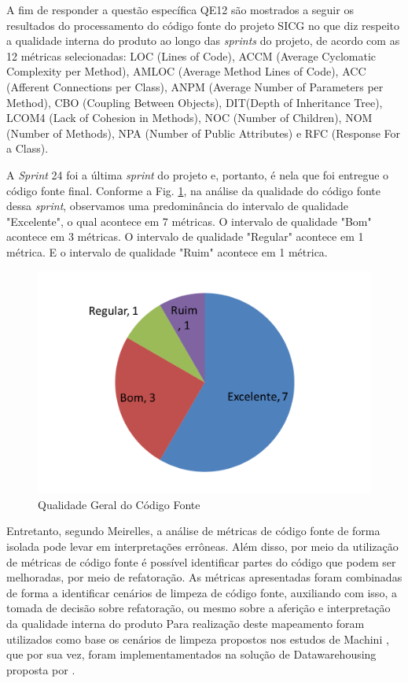 A fim de responder a questão específica QE12 são mostrados a seguir os resultados do processamento do código fonte do projeto SICG no que diz respeito a qualidade interna do produto ao longo das \textit{sprints} do projeto, 
de acordo com as 12 métricas selecionadas: LOC (Lines of Code), ACCM (Average Cyclomatic Complexity per Method), AMLOC (Average Method Lines of Code), ACC (Afferent Connections per Class), ANPM (Average Number of Parameters per Method),
CBO (Coupling Between Objects), DIT(Depth of Inheritance Tree), LCOM4 (Lack of Cohesion in Methods), NOC (Number of Children), NOM (Number of Methods), NPA (Number of Public Attributes) e RFC (Response For a Class).


A \textit{Sprint} 24 foi a última \textit{sprint} do projeto e, portanto, é nela que foi entregue o código fonte final. Conforme a Fig. \ref{pizzatotal}, na análise da qualidade do código fonte dessa \textit{sprint}, observamos uma predominância do intervalo de qualidade "Excelente", o qual acontece em 7 métricas. O intervalo de qualidade "Bom" acontece em 3 métricas. O intervalo de qualidade "Regular" acontece em 1 métrica. E o intervalo de qualidade "Ruim" acontece em 1 métrica.

\begin{figure}[h]
		\centering
			\includegraphics[scale=0.4]{figuras/pizzatotal.png}
		\caption{Qualidade Geral do Código Fonte}
		\label{pizzatotal}
\end{figure}

Entretanto, segundo Meirelles, a análise de métricas de código fonte de forma isolada pode levar em interpretações errôneas. Além disso, por meio da utilização de métricas de código fonte é possível identificar partes do código que podem ser melhoradas, por meio de refatoração. As métricas apresentadas foram combinadas de forma a identificar cenários de limpeza de código fonte, auxiliando com isso, a tomada de decisão sobre refatoração, ou mesmo sobre a aferição e interpretação da qualidade interna do produto Para realização deste mapeamento foram utilizados como base os cenários de limpeza propostos nos estudos de Machini , que por sua vez, foram implementamentados na solução de Datawarehousing proposta por \cite{Baufaker2014}.

